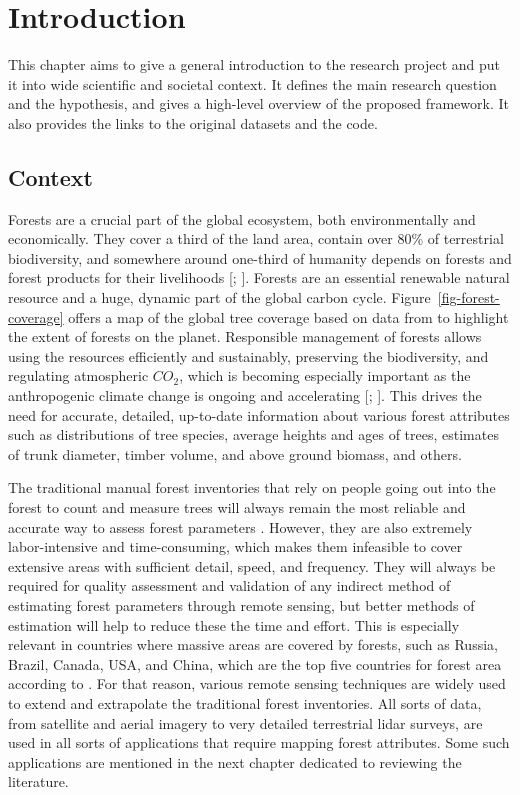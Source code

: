 \chapter{Introduction}\label{cap:introduction}

This chapter aims to give a general introduction to the research project and put it into wide scientific and societal context.
It defines the main research question and the hypothesis, and gives a high-level overview of the proposed framework.
It also provides the links to the original datasets and the code.

\section{Context}
Forests are a crucial part of the global ecosystem, both environmentally and economically.
They cover a third of the land area, contain over 80\% of terrestrial biodiversity, and somewhere around one-third of humanity depends on forests and forest products for their livelihoods [\citet{aertsForestRestorationBiodiversity2011}; \citet{StateWorldsForests2020}].
Forests are an essential renewable natural resource and a huge, dynamic part of the global carbon cycle.
Figure~\ref{fig-forest-coverage} offers a map of the global tree coverage based on data from \citet{hansenHighResolutionGlobalMaps2013} to highlight the extent of forests on the planet.
Responsible management of forests allows using the resources efficiently and sustainably, preserving the biodiversity, and regulating atmospheric $CO_2$, which is becoming especially important as the anthropogenic climate change is ongoing and accelerating [\citet{faheyForestCarbonStorage2010}; \citet{forsterIndicatorsGlobalClimate2024}].
This drives the need for accurate, detailed, up-to-date information about various forest attributes such as distributions of tree species, average heights and ages of trees, estimates of trunk diameter, timber volume, and above ground biomass, and others.

The traditional manual forest inventories that rely on people going out into the forest to count and measure trees will always remain the most reliable and accurate way to assess forest parameters \citep{burleyEncyclopediaForestSciences2004}.
However, they are also extremely labor-intensive and time-consuming, which makes them infeasible to cover extensive areas with sufficient detail, speed, and frequency.
They will always be required for quality assessment and validation of any indirect method of estimating forest parameters through remote sensing, but better methods of estimation will help to reduce these the time and effort.
This is especially relevant in countries where massive areas are covered by forests, such as Russia, Brazil, Canada, USA, and China, which are the top five countries for forest area according to \citet{GlobalForestResources2020}.
For that reason, various remote sensing techniques are widely used to extend and extrapolate the traditional forest inventories.
All sorts of data, from satellite and aerial imagery to very detailed terrestrial \gls{lidar} surveys, are used in all sorts of applications that require mapping forest attributes.
Some such applications are mentioned in the next chapter dedicated to reviewing the literature.

